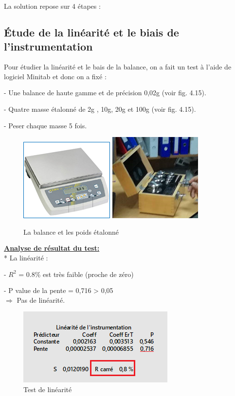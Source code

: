 \documentclass[12pt, a4paper]{thesis}
\begin{document}
La solution repose sur 4 étapes :

\subsection{Étude de la linéarité et le biais de l’instrumentation}

Pour étudier la linéarité et le bais de la balance, on a fait un test à l'aide de logiciel Minitab et donc on a fixé :
\item - Une balance de haute gamme et de précision 0,02g (voir fig. 4.15).
\item - Quatre masse étalonné de 2g , 10g, 20g et 100g (voir fig. 4.15).
\item - Peser chaque masse 5 fois.\\



\begin{figure}[!h]
\begin{center}
\includegraphics[scale=1.1]{bala.png}
\includegraphics[scale=1.05]{etalon.png}
\caption{La balance et les poids étalonné}
\end{center}
\end{figure}
\newpage
\textbf{\underline{Analyse de résultat du test:}}\\
* La linéarité :  

\item - $R^2$ = 0.8\% est très faible (proche de zéro)
\item - P value de la pente = 0,716 > 0,05\\
$\Longrightarrow$ Pas de linéarité. 
 \begin{figure}[!h]
\begin{center}
\includegraphics[scale=1.1]{linaa.png}
\caption{Test de linéarité}
\end{center}
\end{figure}\\
\end{document}
